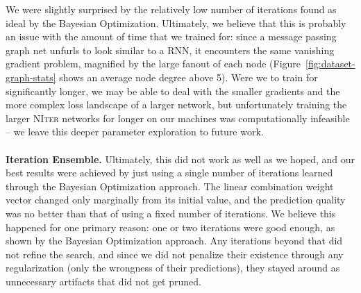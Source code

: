 We were slightly surprised by the relatively low number of iterations found as ideal by the Bayesian Optimization.
Ultimately, we believe that this is probably an issue with the amount of time that we trained for: since a message passing graph net unfurls to look similar to a RNN, it encounters the same vanishing gradient problem, magnified by the large fanout of each node (Figure~\ref{fig:dataset-graph-stats} shows an average node degree above 5).
Were we to train for significantly longer, we may be able to deal with the smaller gradients and the more complex loss landscape of a larger network, but unfortunately training the larger \textsc{NIter} networks for longer on our machines was computationally infeasible -- we leave this deeper parameter exploration to future work.
\\~\\
\textbf{Iteration Ensemble.}
Ultimately, this did not work as well as we hoped, and our best results were achieved by just using a single number of iterations learned through the Bayesian Optimization approach.
The linear combination weight vector changed only marginally from its initial value, and the prediction quality was no better than that of using a fixed number of iterations.
We believe this happened for one primary reason: one or two iterations were good enough, as shown by the Bayesian Optimization approach.
Any iterations beyond that did not refine the search, and since we did not penalize their existence through any regularization (only the wrongness of their predictions), they stayed around as unnecessary artifacts that did not get pruned.
